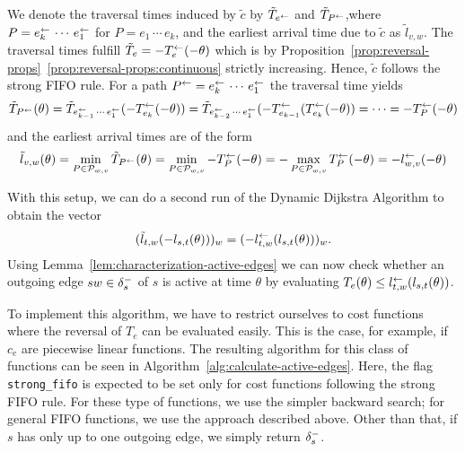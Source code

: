 We denote the traversal times induced by $\tilde c$ by $\tilde T_{e^{\leftarrow}}$ and $\tilde T_{P^{\leftarrow}}$,where $P = e_k^{\leftarrow} \, \cdots \, e_1^{\leftarrow}$ for $P = e_1\,\cdots\, e_k$,
and the earliest arrival time due to $\tilde c$ as $\tilde l_{v,w}$.
The traversal times fulfill $\tilde T_e = -T_e^{\leftarrow}(-\theta)$ which is by Proposition~\ref{prop:reversal-props}~\ref{prop:reversal-props:continuous} strictly increasing.
Hence, $\tilde c$ follows the strong FIFO rule.
For a path $P^{\leftarrow} = e_k^{\leftarrow}\,\cdots\, e_1^{\leftarrow}$ the traversal time yields
\[
    \tilde T_{P^{\leftarrow}} (\theta)
    = \tilde T_{e_{k-1}^{\leftarrow}\,\cdots\,e_1^{\leftarrow}}(- T_{e_k}^{\leftarrow} ( - \theta ))
    = \tilde T_{e_{k-2}^{\leftarrow}\,\cdots\,e_1^{\leftarrow}}(-T_{e_{k-1}}^{\leftarrow} (T_{e_k}^{\leftarrow} ( - \theta ))
    = \cdots
    = - T_P^{\leftarrow}(-\theta)
\]
and the earliest arrival times are of the form
\[
    \tilde l_{v,w}(\theta)
    = \min_{P\in\mathcal{P}_{w,v}} \tilde T_{P^{\leftarrow}}(\theta)
    = \min_{P\in\mathcal{P}_{w,v}} - T_P^{\leftarrow}(-\theta)
    = - \max_{P\in\mathcal{P}_{w,v}} T_P^{\leftarrow}(-\theta)
    = - l_{w,v}^{\leftarrow}(-\theta)
\]

With this setup, we can do a second run of the Dynamic Dijkstra Algorithm to obtain the vector \[
    (\tilde l_{t,w}( - l_{s,t}(\theta) ))_w = (- l_{t,w}^{\leftarrow}( l_{s,t}(\theta) ))_w.
\]
Using Lemma~\ref{lem:characterization-active-edges} we can now check whether an outgoing edge $sw\in\delta^-_{s}$ of $s$ is active at time $\theta$ by evaluating $T_e(\theta) \leq l_{t,w}^{\leftarrow}( l_{s,t}(\theta))$.

To implement this algorithm, we have to restrict ourselves to cost functions where the reversal of $T_e$ can be evaluated easily.
This is the case, for example, if $c_e$ are piecewise linear functions.
The resulting algorithm for this class of functions can be seen in Algorithm~\ref{alg:calculate-active-edges}.
Here, the flag \texttt{strong\_fifo} is expected to be set only for cost functions following the strong FIFO rule.
For these type of functions, we use the simpler backward search; for  general FIFO functions, we use the approach described above.
Other than that, if $s$ has only up to one outgoing edge, we simply return $\delta^-_{s}$.


